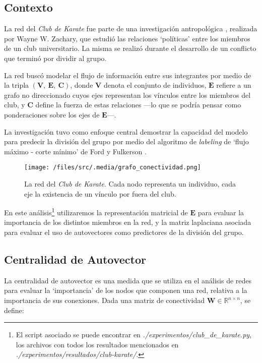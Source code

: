 
\vspace{1em}
\subsection{Contexto}

La red del \textit{Club de Karate} fue parte de una investigación antropológica \cite{Zachary}, realizada por Wayne W. Zachary, que estudió las relaciones `políticas' entre los miembros de un club universitario. La misma se realizó durante el desarrollo de un conflicto que terminó por dividir al grupo. 

La red buscó modelar el flujo de información entre sus integrantes por medio de la tripla $(\mathbf{V},\ \mathbf{E},\ \mathbf{C})$, donde $\mathbf{V}$ denota el conjunto de individuos, $\mathbf{E}$ refiere a un grafo no direccionado cuyos ejes representan los vínculos entre los miembros del club, y $\mathbf{C}$ define la fuerza de estas relaciones ---lo que se podría pensar como ponderaciones sobre los ejes de $\mathbf{E}$---. 

\vspace{1em}
La investigación tuvo como enfoque central demostrar la capacidad del modelo para predecir la división del grupo por medio del algoritmo de \textit{labeling} de `flujo máximo - corte mínimo' de Ford y Fulkerson \cite{Ford}.

\vspace{1em}
\begin{figure}[!htbp]
\texttt{[image: /files/src/.media/grafo\_conectividad.png]}
\caption{La red del \textit{Club de Karate}. Cada nodo representa un individuo, cada eje la existencia de un vínculo por fuera del club.}
\end{figure}


\vspace{1em}
En este análisis\footnote{El script asociado se puede encontrar en \textit{./experimentos/club\_de\_karate.py}, los archivos con todos los resultados mencionados en \textit{./experimentos/resultados/club-karate/}.} utilizaremos la representación matricial de $\mathbf{E}$ para evaluar la importancia de los distintos miembros en la red, y la matriz laplaciana asociada para evaluar el uso de autovectores como predictores de la división del grupo. 




\newpage
\vspace{2em}
\subsection{Centralidad de Autovector} La centralidad de autovector es una medida que se utiliza en el análisis de redes para evaluar la `importancia' de los nodos que componen una red, relativa a la importancia de sus conexiones. Dada una matriz de conectividad $\mathbf{W} \in \mathbb{R}^{n \times n}$, se define:

